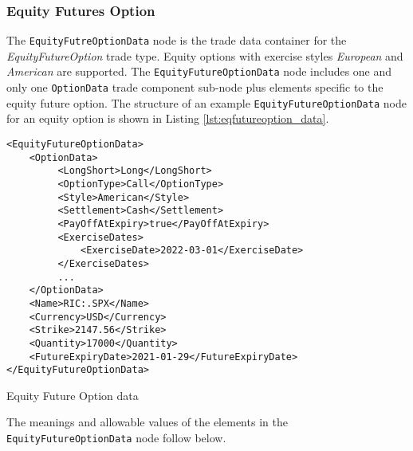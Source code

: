 \subsubsection{Equity Futures Option}

The \lstinline!EquityFutreOptionData!  node is the trade data container for the \emph{EquityFutureOption} trade type.  Equity 
options with exercise styles \emph{European} and \emph{American} are supported. The \lstinline!EquityFutureOptionData!  node includes one and 
only one \lstinline!OptionData! trade component sub-node plus elements specific to the equity future option. The structure of 
an example \lstinline!EquityFutureOptionData! node for an equity option is shown in Listing
\ref{lst:eqfutureoption_data}.

\begin{listing}[H]
\begin{verbatim}
<EquityFutureOptionData>
    <OptionData>
         <LongShort>Long</LongShort>
         <OptionType>Call</OptionType>
         <Style>American</Style>
         <Settlement>Cash</Settlement>
         <PayOffAtExpiry>true</PayOffAtExpiry>
         <ExerciseDates>
             <ExerciseDate>2022-03-01</ExerciseDate>
         </ExerciseDates>
         ...
    </OptionData>
    <Name>RIC:.SPX</Name>
    <Currency>USD</Currency>
    <Strike>2147.56</Strike>
    <Quantity>17000</Quantity>
    <FutureExpiryDate>2021-01-29</FutureExpiryDate>
</EquityFutureOptionData>
\end{verbatim}
\caption{Equity Future Option data}
\label{lst:eqfutureoption_data}
\end{listing}

The meanings and allowable values of the elements in the \lstinline!EquityFutureOptionData!  node follow below.

